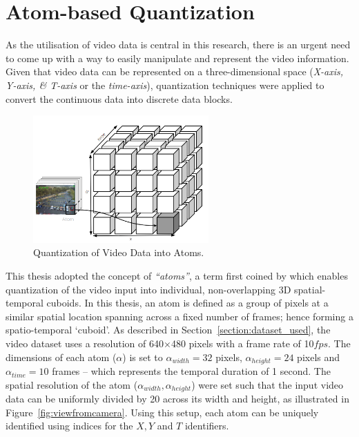 \section{Atom-based Quantization}
\label{section:atoms}

As the utilisation of video data is central in this research, there is an urgent need to come up with a way to easily manipulate and represent the video information. Given that video data can be represented on a three-dimensional space (\textit{X-axis, Y-axis, \& T-axis} or the \textit{time-axis}), quantization techniques were applied to convert the continuous data into discrete data blocks.


\begin{figure}[H]\centering
\includegraphics[width=0.6\textwidth]{image/general/atom.PNG}
\caption[Quantization of Video Data into Atoms.]
{Quantization of Video Data into Atoms.
}
\label{fig:atoms}
\end{figure}

This thesis adopted the concept of \textit{``atoms''}, a term first coined by \cite{castanon2016retrieval} which enables quantization of the video input into individual, non-overlapping 3D spatial-temporal cuboids. In this thesis, an atom is defined as a group of pixels at a similar spatial location spanning across a fixed number of frames; hence forming a spatio-temporal `cuboid'.
As described in Section~\ref{section:dataset_used}, the video dataset uses a resolution of 640$\times$480 pixels with a frame rate of 10$fps$.
The dimensions of each atom ($\alpha$) is set to $\alpha_{width}=32$ pixels, $\alpha_{height}=24$ pixels and $\alpha_{time}=10$ frames -- which represents the temporal duration of 1 second.
The spatial resolution of the atom ($\alpha_{width},\alpha_{height}$) were set such that the input video data can be uniformly divided by 20 across its width and height, as illustrated in Figure~\ref{fig:viewfromcamera}. Using this setup, each atom can be uniquely identified using indices for the $X, Y$ and $T$ identifiers.

